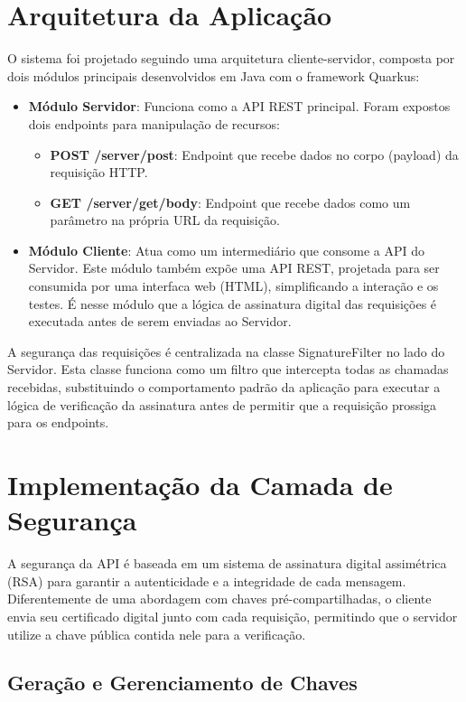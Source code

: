 \documentclass[12pt]{article}
\begin{document}
\section{Arquitetura da Aplicação}

O sistema foi projetado seguindo uma arquitetura cliente-servidor, composta por dois módulos principais desenvolvidos em Java com o framework Quarkus:

\begin{itemize}
    \item \textbf{Módulo Servidor}: Funciona como a API REST principal. Foram expostos dois endpoints para manipulação de recursos:
    \begin{itemize}
        \item \textbf{POST /server/post}: Endpoint que recebe dados no corpo (payload) da requisição HTTP.
        \item  \textbf{GET /server/get/{body}}: Endpoint que recebe dados como um parâmetro na própria URL da requisição.
    \end{itemize}
    \item  \textbf{Módulo Cliente}: Atua como um intermediário que consome a API do Servidor. Este módulo também expõe uma API REST, projetada para ser consumida por uma interfaca web (HTML), simplificando a interação e os testes. É nesse módulo que a lógica de assinatura digital das requisições é executada antes de serem enviadas ao Servidor.
\end{itemize}

A segurança das requisições é centralizada na classe SignatureFilter no lado do Servidor. Esta classe funciona como um filtro que intercepta todas as chamadas recebidas, substituindo o comportamento padrão da aplicação para executar a lógica de verificação da assinatura antes de permitir que a requisição prossiga para os endpoints.

\section{Implementação da Camada de Segurança}

A segurança da API é baseada em um sistema de assinatura digital assimétrica (RSA) para garantir a autenticidade e a integridade de cada mensagem. Diferentemente de uma abordagem com chaves pré-compartilhadas, o cliente envia seu certificado digital junto com cada requisição, permitindo que o servidor utilize a chave pública contida nele para a verificação.

\subsection{Geração e Gerenciamento de Chaves}
\end{document}
